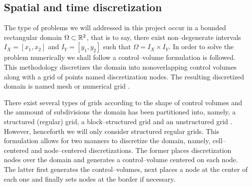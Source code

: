 
\subsection{Spatial and time discretization}

The type of problems we will addressed in this project occur in a bounded
rectangular domain $\Omega \subset \mathbb{R}^2$, that is to say, there exist
non--degenerate intervals $I_X = [x_1, x_2]$ and $I_Y = [y_1, y_2]$ such that
$\Omega = I_X \times I_Y$. In order to solve the problem numerically we shall
follow a control--volume formulation is followed. This methodology discretizes
the domain into nonoverlapping control volumes along with a grid of points named
discretization nodes. The resulting discretized domain is named mesh or
numerical grid \cite{patankar2008numerical}.

There exist several types of grids according to the shape of control volumes and
the ammount of subdivisions the domain has been partitioned into, namely, a
structured (regular) grid, a block--structured grid and an unstructured grid
\cite{ferziger2002computational2grid}. However, henceforth we will only consider
structured regular grids. This formulation allows for two manners to discretize
the domain, namely, cell--centered and node--centered discretizations. The
former places discretization nodes over the domain and generates a
control--volume centered on each node. The latter first generates the
control--volumes, next places a node at the center of each one and finally sets
nodes at the border if necessary.

